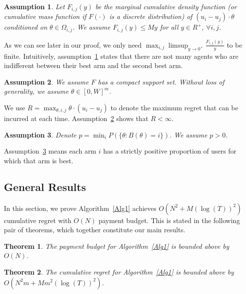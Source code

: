 \documentclass{article}
\newtheorem{theorem}{Theorem}
\newtheorem{assumption}{Assumption}
\begin{document}
\begin{assumption} Let $F_{i,j}(y)$ be the marginal cumulative density function (or cumulative mass function if $F(\cdot)$ is a discrete distribution) of $(u_i-u_j)\cdot\theta$ conditioned on $\theta \in \Omega_{i,j}$. We assume $F_{i,j}(y)\leq My$ for all $y\in R^{+}$, $\forall i,j$. 
\label{A1}
\end{assumption}

As we can see later in our proof, we only need $\max_{i,j}\limsup_{y\rightarrow 0^{+}}\frac{F_{i,j}(y)}{y}$ to be finite. Intuitively, assumption~\ref{A1} states that there are not many agents who are indifferent between their best arm and the second best arm. 

\begin{assumption} We assume $F$ has a compact support set. Without loss of generality, we assume $\theta\in [0,W]^m$.
\label{A2}
\end{assumption}

We use $R = \max_{\theta, i,j} \theta \cdot (u_i - u_j)$ to denote the maximum regret that can be incurred at each time.  Assumption~\ref{A2} shows that $R<\infty$.

\begin{assumption}
Denote $p=\min_{i}P(\{\theta: B(\theta)=i\})$. We assume $p>0$.
\label{A3}
\end{assumption}

Assumption~\ref{A3} means each arm $i$ has a strictly positive proportion of users for which that arm is best. 


\subsection{General Results}

In this section, we prove Algorithm~\ref{Alg1} achieves $O(N^2+M(\log(T))^2)$ cumulative regret with $O(N)$ payment budget.  This is stated in the following pair of theorems, which together constitute our main results.

\begin{theorem}
The payment budget for Algorithm~\ref{Alg1} is bounded above by $O(N)$. 
\label{rst:budget}
\end{theorem}


\begin{theorem}
The cumulative regret for Algorithm~\ref{Alg1} is bounded above by $O(N^2 m + M m^2(\log(T))^2)$.
\label{rst:regret}
\end{theorem}
\end{document}
